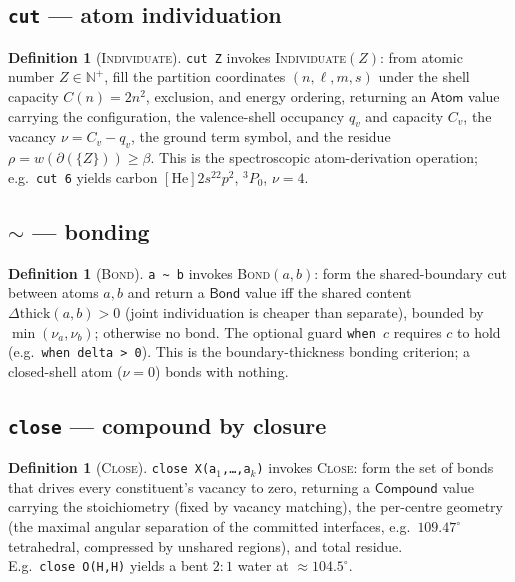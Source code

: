 \documentclass[11pt,a4paper]{article}
\theoremstyle{thmstyle}
\theoremstyle{definition}
\newtheorem{definition}[theorem]{Definition}
\theoremstyle{remark}
\newcommand{\N}{\mathbb{N}}
\newcommand{\flo}{\beta}
\newcommand{\res}{\rho}
\newcommand{\cut}{\partial}
\newcommand{\hj}[1]{\texttt{#1}}
\begin{document}
\subsection{\texorpdfstring{\hj{cut} --- atom individuation}{cut --- atom individuation}}
\label{sec:stdlib-atom}

\begin{definition}[\textsc{Individuate}]
\label{def:individuate}
\hj{cut\ Z} invokes \textsc{Individuate}$(Z)$: from atomic number
$Z\in\N^{+}$, fill the partition coordinates $(n,\ell,m,s)$ under the
shell capacity $C(n)=2n^2$, exclusion, and energy ordering, returning an
$\mathsf{Atom}$ value carrying the configuration, the valence-shell
occupancy $q_v$ and capacity $C_v$, the vacancy $\nu=C_v-q_v$, the ground
term symbol, and the residue $\res=w(\cut(\{Z\}))\ge\flo$. This is the
spectroscopic atom-derivation operation; e.g.\ \hj{cut\ 6} yields carbon
$[\mathrm{He}]2s^22p^2$, $^3P_0$, $\nu=4$.
\end{definition}

\subsection{\texorpdfstring{\hj{$\sim$} --- bonding}{~ --- bonding}}
\label{sec:stdlib-bond}

\begin{definition}[\textsc{Bond}]
\label{def:bond}
\hj{a\ \~{}\ b} invokes \textsc{Bond}$(a,b)$: form the shared-boundary cut
between atoms $a,b$ and return a $\mathsf{Bond}$ value iff the shared
content $\Delta\mathrm{thick}(a,b)>0$ (joint individuation is cheaper than
separate), bounded by $\min(\nu_a,\nu_b)$; otherwise no bond. The optional
guard \hj{when\ }$c$ requires $c$ to hold (e.g.\ \hj{when\ delta\ >\ 0}).
This is the boundary-thickness bonding criterion; a closed-shell atom
($\nu=0$) bonds with nothing.
\end{definition}

\subsection{\texorpdfstring{\hj{close} --- compound by closure}{close --- compound by closure}}
\label{sec:stdlib-compound}

\begin{definition}[\textsc{Close}]
\label{def:close}
\hj{close\ X(a$_1$,\ldots,a$_k$)} invokes \textsc{Close}: form the set of
bonds that drives every constituent's vacancy to zero, returning a
$\mathsf{Compound}$ value carrying the stoichiometry (fixed by vacancy
matching), the per-centre geometry (the maximal angular separation of the
committed interfaces, e.g.\ $109.47^\circ$ tetrahedral, compressed by
unshared regions), and total residue. E.g.\ \hj{close\ O(H,H)} yields a
bent $2{:}1$ water at $\approx104.5^\circ$.
\end{definition}
\end{document}
